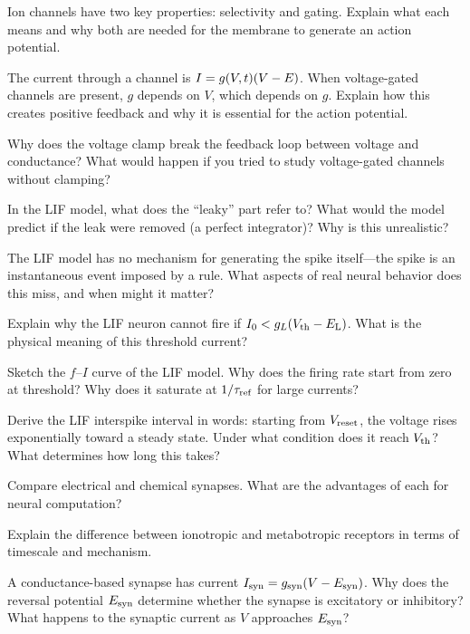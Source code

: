 \begin{conceptquestions}
  \item Ion channels have two key properties: selectivity and gating. Explain what each means and why both are needed for the membrane to generate an action potential.

  \item The current through a channel is $I = g(V,t)(V - E_{\mathrm{}})$. When voltage-gated channels are present, $g$ depends on $V$, which depends on $g$. Explain how this creates positive feedback and why it is essential for the action potential.

  \item Why does the voltage clamp break the feedback loop between voltage and conductance? What would happen if you tried to study voltage-gated channels without clamping?

  \item In the LIF model, what does the ``leaky'' part refer to? What would the model predict if the leak were removed (a perfect integrator)? Why is this unrealistic?

  \item The LIF model has no mechanism for generating the spike itself---the spike is an instantaneous event imposed by a rule. What aspects of real neural behavior does this miss, and when might it matter?

  \item Explain why the LIF neuron cannot fire if $I_0 < g_L(V_{\text{th}} - E_{\mathrm{L}})$. What is the physical meaning of this threshold current?

  \item Sketch the $f$--$I$ curve of the LIF model. Why does the firing rate start from zero at threshold? Why does it saturate at $1/\tau_{\text{ref}}$ for large currents?

  \item Derive the LIF interspike interval in words: starting from $V_{\text{reset}}$, the voltage rises exponentially toward a steady state. Under what condition does it reach $V_{\text{th}}$? What determines how long this takes?

  \item Compare electrical and chemical synapses. What are the advantages of each for neural computation?

  \item Explain the difference between ionotropic and metabotropic receptors in terms of timescale and mechanism.

  \item A conductance-based synapse has current $I_{\text{syn}} = g_{\text{syn}}(V - E_{\mathrm{\text{syn}}})$. Why does the reversal potential $E_{\mathrm{\text{syn}}}$ determine whether the synapse is excitatory or inhibitory? What happens to the synaptic current as $V$ approaches $E_{\mathrm{\text{syn}}}$?


\end{conceptquestions}
